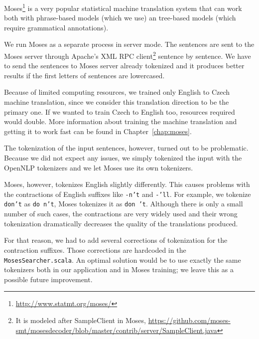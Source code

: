 Moses\footnote{\url{http://www.statmt.org/moses/}} is a very popular statistical machine translation system that can work both with phrase-based models (which we use) an tree-based models (which require grammatical annotations).

We run Moses as a separate process in server mode. The sentences are sent to the Moses server through Apache's XML RPC client\footnote{It is modeled after SampleClient in Moses, \url{https://github.com/moses-smt/mosesdecoder/blob/master/contrib/server/SampleClient.java}} sentence by sentence. We have to send the sentences to Moses server already tokenized and it produces better results if the first letters of sentences are lowercased.

Because of limited computing resources, we trained only English to Czech machine translation, since we consider this translation direction to be the primary one. If we wanted to train Czech to English too, resources required would double. More information about training the machine translation and getting it to work fast can be found in Chapter~\ref{chap:moses}.

The tokenization of the input sentences, however, turned out to be problematic. Because we did not expect any issues,
we simply tokenized the input with the OpenNLP tokenizers and we let Moses use its own tokenizers.

Moses, however, tokenizes English slightly differently. This causes problems with the contractions of English suffixes like \texttt{-n't} and \texttt{-'ll}. For example, we tokenize \texttt{don't} as \texttt{do n't}, Moses tokenizes it as \texttt{don 't}. Although there is only a small number of such cases, the contractions are very widely used and their wrong tokenization
dramatically decreases the quality of the translations produced.

For that reason, we had to add several corrections of tokenization for the contraction suffixes.
Those corrections are hardcoded in the \texttt{MosesSearcher.scala}.
An optimal solution would be to use exactly the same tokenizers both in our application and in Moses training; we leave this as a possible future improvement.

